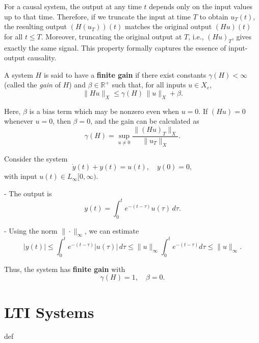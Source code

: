 \begin{example}
\begin{center}
\vspace{0.5cm}

\end{center}
\end{example}

\begin{remark}
For a causal system, the output at any time $t$ depends only on the input values up to that time. Therefore, if we truncate the input at time $T$ to obtain $u_T(t)$, the resulting output $(H(u_T))(t)$ matches the original output $(Hu)(t)$ for all $t \le T$. Moreover, truncating the original output at $T$, i.e., $(Hu)_T$, gives exactly the same signal. This property formally captures the essence of input-output causality.
\end{remark}

\begin{definition}
A system $H$ is said to have a \textbf{finite gain} if there exist constants 
\(\gamma(H) < \infty\) (called the \emph{gain} of $H$) and \(\beta \in \mathbb{R}^+\) such that, for all inputs \(u \in X_e\),
\[
\| Hu \|_X \le \gamma(H) \, \| u \|_X + \beta.
\]

Here, \(\beta\) is a bias term which may be nonzero even when \(u = 0\).  
If \((Hu) = 0\) whenever \(u = 0\), then \(\beta = 0\), and the gain can be calculated as
\[
\gamma(H) = \sup_{u \neq 0} \frac{\| (Hu)_T \|_X}{\| u_T \|_X}.
\]
\end{definition}

\begin{example}
Consider the system
\[
\dot{y}(t) + y(t) = u(t), \quad y(0)=0,
\]
with input \(u(t) \in L_\infty[0,\infty)\).  

- The output is 
\[
y(t) = \int_0^t e^{-(t-\tau)} u(\tau) \, d\tau.
\]  

- Using the norm \(\| \cdot \|_\infty\), we can estimate
\[
|y(t)| \le \int_0^t e^{-(t-\tau)} |u(\tau)| \, d\tau \le \| u \|_\infty \int_0^t e^{-(t-\tau)} d\tau \le \| u \|_\infty.
\]

Thus, the system has \textbf{finite gain} with 
\[
\gamma(H) = 1, \quad \beta = 0.
\]
\end{example}

\section{LTI Systems}
def
